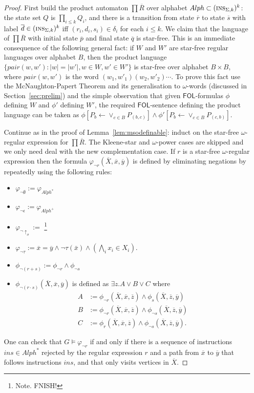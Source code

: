 \documentclass{aamas2015}
\newcommand{\tup}[1]{\overline{#1}}
\def\ins{\textsc{ins}}
\def\fol{\mathsf{FOL}}
\newcommand{\sr}[1]{\footnote{{\color{red} Note. #1}}}
\begin{document}
\begin{proof}

First build the product automaton $\prod \tup{R}$ over alphabet $Alph \subset (\ins_{\Sigma,k})^k$: the state set $Q$ is $\prod_{i \leq k} Q_i$,  and there is a transition from state $\tup{r}$ to state $\tup{s}$ with label $\tup{d} \in (\ins_{\Sigma,k})^k$ iff $(r_i,d_i,s_i) \in \delta_i$ for each $i \leq k$. We claim that the language of $\prod \tup{R}$ with initial state $\tup{p}$ and final state $\tup{q}$ is star-free. This is an immediate consequence of the following general fact: if $W$ and $W'$ are star-free regular languages over alphabet $B$, then the product language $\{pair(w,w') : |w| = |w'|, w \in W, w' \in W'\}$ is star-free over alphabet $B\times B$, where $pair(w,w')$ is the word $(w_1, w'_1) (w_2,w'_2) \cdots$. To prove this fact use the McNaughton-Papert Theorem and its generalisation to $\omega$-words (discussed in Section~\ref{sec:prelim})  and the simple observation that given $\fol$-formulas $\phi$ defining $W$ and $\phi'$ defining $W'$,  the required $\fol$-sentence defining the product language can be taken as $\phi[P_b \gets \vee_{c\in B} P_{(b,c)}] \wedge \phi'[P_b \gets \vee_{c\in B} P_{(c,b)}]$.

Continue as in the proof of Lemma~\ref{lem:msodefinable}: induct on the star-free $\omega$-regular expression for $\prod \tup{R}$. The Kleene-star and $\omega$-power cases are skipped and we only need deal with the new complementation case. If $r$ is a star-free $\omega$-regular expression then the formula $\varphi_{\neg r}(\tup{X},\tup{x},\tup{y})$ is defined by eliminating negations by repeatedly using the following rules:
\begin{itemize}
\item $\varphi_{\neg \emptyset} := \varphi_{Alph^*}$
\item $\varphi_{\neg \epsilon} := \varphi_{Alph^+}$
\item $\varphi_{\neg \uparrow_\sigma} := $ \sr{FNISH!}
\item $\varphi_{\neg \tau} := \tup{x} = \tup{y} \wedge \neg \tau(\bar{x}) \wedge (\bigwedge_i x_i \in X_i)$.
\item $\phi_{\neg (r + s)} := \phi_{\neg r} \wedge \phi_{\neg s}$
\item $\phi_{\neg (r \cdot s)}(\tup{X},\tup{x},\tup{y})$ is defined as $\exists z. A \vee B \vee C$ where
\begin{align*}
A &:= \phi_{\neg r}(\tup{X},\tup{x},\tup{z}) \wedge \phi_{s}(\tup{X},\tup{z},\tup{y})\\
B &:= \phi_{\neg r}(\tup{X},\tup{x},\tup{z}) \wedge \phi_{\neg s}(\tup{X},\tup{z},\tup{y})\\
C &:= \phi_{r}(\tup{X},\tup{x},\tup{z}) \wedge \phi_{\neg s}(\tup{X},\tup{z},\tup{y}).
\end{align*}
\end{itemize}
One can check that $G \models \varphi_{\neg r}$ if and only if there is a sequence of instructions $ins \in Alph^*$ rejected  by the regular expression $r$ and a path from $\tup{x}$ to $\tup{y}$ that follows instructions $ins$, and that only visits vertices in $\tup{X}$.
\end{proof}
\fi
\end{document}
